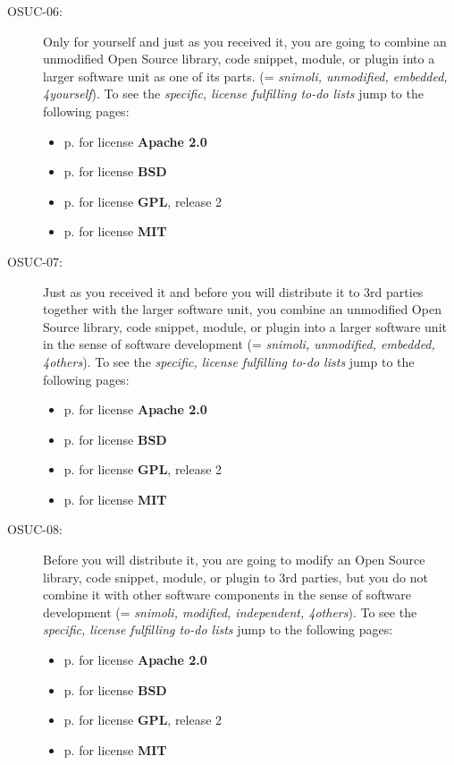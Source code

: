 \begin{description}
\item[OSUC-06:]\label{OSUC-06-DEF} Only for yourself and just as you received
it, you are going to combine an unmodified Open Source library, code snippet,
module, or plugin into a larger software unit as one of its parts. (=
\textit{snimoli, unmodified, embedded, 4yourself}).
To see the \textit{specific, license fulfilling to-do lists} jump to the
following pages:
  \begin{itemize}
    \item p. \pageref{OSUC-06-Apache20} for license \textbf{Apache 2.0}
    \item p. \pageref{OSUC-06-BSD} for license \textbf{BSD}
    \item p. \pageref{OSUC-06-GPL2X} for license \textbf{GPL}, release 2
    \item p. \pageref{OSUC-06-MIT} for license \textbf{MIT}
  \end{itemize}

\item[OSUC-07:]\label{OSUC-07-DEF} Just as you received it and before you will
distribute it to 3rd parties together with the larger software unit, you
combine an unmodified Open Source library, code snippet, module, or plugin into
a larger software unit in the sense of software development (= \textit{snimoli,
unmodified, embedded, 4others}). 
To see the \textit{specific, license fulfilling to-do lists} jump to the
following pages:
  \begin{itemize}
    \item p. \pageref{OSUC-07-Apache20} for license \textbf{Apache 2.0}
    \item p. \pageref{OSUC-07-BSD} for license \textbf{BSD}
    \item p. \pageref{OSUC-07-GPL2X} for license \textbf{GPL}, release 2
    \item p. \pageref{OSUC-07-MIT} for license \textbf{MIT}
  \end{itemize}

\item[OSUC-08:]\label{OSUC-08-DEF} Before you will distribute it, you are going
to modify an Open Source library, code snippet, module, or plugin to 3rd
parties, but you do not combine it with other software components in the sense of
software development (= \textit{snimoli, modified, independent, 4others}). 
To see the \textit{specific, license fulfilling to-do lists} jump to the
following pages:
  \begin{itemize}
    \item p. \pageref{OSUC-08-Apache20} for license \textbf{Apache 2.0}
    \item p. \pageref{OSUC-08-BSD} for license \textbf{BSD}
    \item p. \pageref{OSUC-08-GPL2X} for license \textbf{GPL}, release 2
    \item p. \pageref{OSUC-08-MIT} for license \textbf{MIT}
  \end{itemize}


\end{description}
